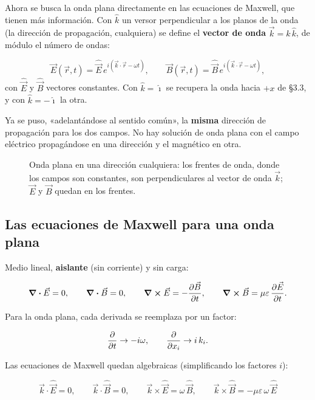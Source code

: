 \documentclass[12pt,a4paper]{article}
\begin{document}
Ahora se busca la onda plana directamente en las ecuaciones de Maxwell, que
tienen más información. Con $\hat k$ un versor perpendicular a los planos de la
onda (la dirección de propagación, cualquiera) se define el \textbf{vector de onda}
$\vec k = k\,\hat k$, de módulo el número de ondas:

\[
\vec E(\vec r,t) = \hat{\vec E}\,e^{i(\vec k\cdot\vec r-\omega t)},
\qquad
\vec B(\vec r,t) = \hat{\vec B}\,e^{i(\vec k\cdot\vec r-\omega t)},
\]
con $\hat{\vec E}$ y $\hat{\vec B}$ vectores constantes. Con $\hat k = \hat\imath$
se recupera la onda hacia $+x$ de §3.3, y con $\hat k = -\hat\imath$ la otra.

\begin{notebox}
Ya se puso, «adelantándose al sentido común», la \textbf{misma} dirección de
propagación para los dos campos. No hay solución de onda plana con el campo
eléctrico propagándose en una dirección y el magnético en otra.
\end{notebox}

\begin{figure}[H]
  \centering
  
  \caption{Onda plana en una dirección cualquiera: los frentes de onda, donde los campos son constantes, son perpendiculares al vector de onda $\vec k$; $\vec E$ y $\vec B$ quedan en los frentes.}
\end{figure}

\subsection{Las ecuaciones de Maxwell para una onda plana}

Medio lineal, \textbf{aislante} (sin corriente) y sin carga:

\[
\div\vec E = 0,\qquad \div\vec B = 0,\qquad
\curl\vec E = -\pdv{\vec B}{t},\qquad
\curl\vec B = \mu\varepsilon\,\pdv{\vec E}{t}.
\]

Para la onda plana, cada derivada se reemplaza por un factor:

\[
\pdv{t}\to -i\omega,\qquad \pdv{x_i}\to i\,k_i .
\]

Las ecuaciones de Maxwell quedan algebraicas (simplificando los factores $i$):

\begin{keybox}
\[
\boxed{\ \vec k\cdot\hat{\vec E} = 0,\qquad
\vec k\cdot\hat{\vec B} = 0,\qquad
\vec k\times\hat{\vec E} = \omega\,\hat{\vec B},\qquad
\vec k\times\hat{\vec B} = -\mu\varepsilon\,\omega\,\hat{\vec E}\ }
\]
\end{keybox}
\end{document}
